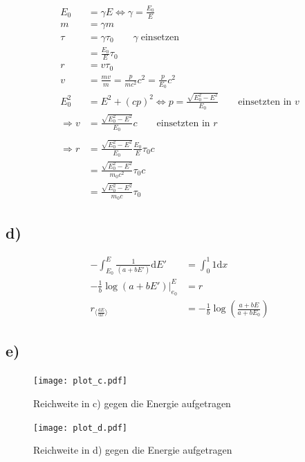     \begin{align}
        E_0 &= \gamma E \Leftrightarrow \gamma = \frac{E_0}{E}\\
        m &= \gamma m\\
        \tau &= \gamma \tau_0 \qquad \gamma\; \text{einsetzen}\\
        &= \frac{E_0}{E} \tau_0\\
        r &= v\tau_0\\
        v &= \frac{mv}{m} = \frac{p}{mc^2}c^2 = \frac{p}{E_0}c^2\\
        E_0^2 &= E^2 + (cp)^2 \Leftrightarrow p = \frac{\sqrt{E_0^2-E^2}}{E_0} \qquad \text{einsetzten in $v$}\\
        \Rightarrow v &= \frac{\sqrt{E_0^2-E^2}}{E_0}c \qquad \text{einsetzten in $r$}\\
        \\
        \Rightarrow r &= \frac{\sqrt{E_0^2-E^2}}{E_0} \frac{E_0}{E} \tau_0 c\\
        &= \frac{\sqrt{E_0^2-E^2}}{m_0 c^2} \tau_0 c\\
        &= \frac{\sqrt{E_0^2-E^2}}{m_0 c} \tau_0
    \end{align}

\subsection{d)}

    \begin{align}
        -\int_{E_0}^{E} \frac{1}{(a+bE')} \mathrm{d}E' &= \int_{0}^{1} 1 \mathrm{d}x\\
        -\frac{1}{b}\log(a+bE')\vert_{e_0}^{E} &= r\\
        r_{\langle \frac{\mathrm{d}E}{\mathrm{d}x} \rangle} &= -\frac{1}{b}\log\left(\frac{a+bE}{a+bE_0}\right)
    \end{align}

\subsection{e)}


\begin{figure}[H]
    \centering
    \texttt{[image: plot\_c.pdf]}
    \caption{Reichweite in c) gegen die Energie aufgetragen}
\end{figure}


\begin{figure}[H]
    \centering
    \texttt{[image: plot\_d.pdf]}
    \caption{Reichweite in d) gegen die Energie aufgetragen}
\end{figure}


